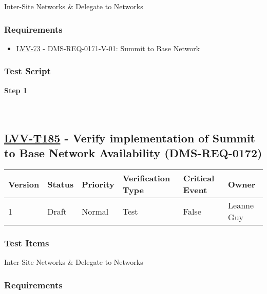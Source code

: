 Inter-Site Networks \& Delegate to Networks

\hypertarget{requirements-84}{%
\subsubsection{Requirements}\label{requirements-84}}

\begin{itemize}
\tightlist
\item
  \href{https://jira.lsstcorp.org/browse/LVV-73}{LVV-73} -
  DMS-REQ-0171-V-01: Summit to Base Network
\end{itemize}

\hypertarget{test-script-84}{%
\subsubsection{Test Script}\label{test-script-84}}

\textbf{Step 1}\\
~\\
~\\

\hypertarget{lvv-t185---verify-implementation-of-summit-to-base-network-availability-dms-req-0172}{%
\subsection{\texorpdfstring{\href{https://jira.lsstcorp.org/secure/Tests.jspa\#/testCase/LVV-T185}{LVV-T185}
- Verify implementation of Summit to Base Network Availability
(DMS-REQ-0172)}{LVV-T185 - Verify implementation of Summit to Base Network Availability (DMS-REQ-0172)}}\label{lvv-t185---verify-implementation-of-summit-to-base-network-availability-dms-req-0172}}

\begin{longtable}[]{@{}llllll@{}}
\toprule
Version & Status & Priority & Verification Type & Critical Event &
Owner\tabularnewline
\midrule
\endhead
1 & Draft & Normal & Test & False & Leanne Guy\tabularnewline
\bottomrule
\end{longtable}

\hypertarget{test-items-85}{%
\subsubsection{Test Items}\label{test-items-85}}

Inter-Site Networks \& Delegate to Networks

\hypertarget{requirements-85}{%
\subsubsection{Requirements}\label{requirements-85}}

